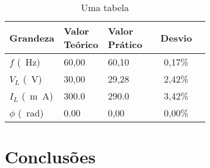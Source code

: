 \documentclass[11pt, twocolumn]{article}
\begin{document}
                \begin{table}[!htp]
                        \begin{tabular}{m{0.225\linewidth}
                                        m{0.225\linewidth}
                                        m{0.225\linewidth} c}
                                        \toprule
                                Grandeza &
                                \hbox{Valor} Teórico &
                                \hbox{Valor} Prático & Desvio\\
                                \midrule

                                $f$ (\SI{}{\hertz}) &
                                60,00 &
                                60,10 &
                                0,17\% \\

                                $V_{L}$ (\SI{}{\volt}) &
                                30,00 &
                                29,28 &
                                2,42\% \\

                                $I_{L}$ (\SI{}{m\ampere}) &
                                \SI{300,0}{} &
                                \SI{290,0}{} &
                                3,42\% \\

                                $\phi$ (\SI{}{\radian}) &
                                0.00 &
                                0,00 &
                                0,00\% \\ \hline
                        \end{tabular}
                        \caption{\small Uma tabela}
                        \label{REFERENCIA_TABELA}
                \end{table}

                \lipsum[8]
                \cite{NOME_DE_REFERENCIA_LIVRO}

        \section{Conclusões}
                \lipsum[9-10]
        \printbibliography
\end{document}
